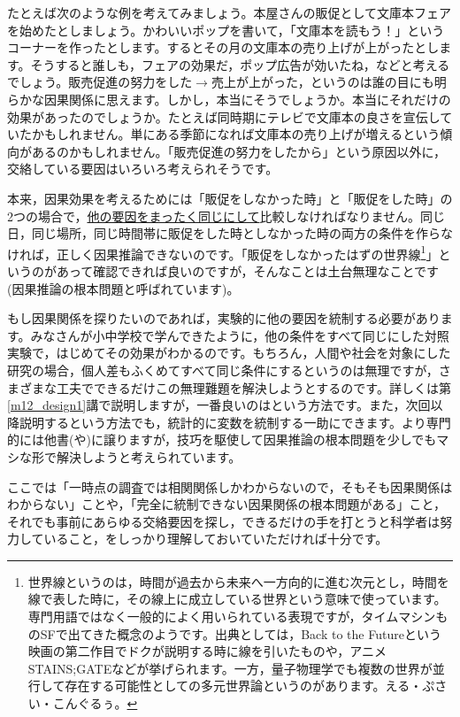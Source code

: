 \documentclass{ltjbook}
\begin{document}
たとえば次のような例を考えてみましょう。本屋さんの販促として文庫本フェアを始めたとしましょう。かわいいポップを書いて，「文庫本を読もう！」というコーナーを作ったとします。するとその月の文庫本の売り上げが上がったとします。そうすると誰しも，フェアの効果だ，ポップ広告が効いたね，などと考えるでしょう。販売促進の努力をした$\to$売上が上がった，というのは誰の目にも明らかな因果関係に思えます。しかし，本当にそうでしょうか。本当にそれだけの効果があったのでしょうか。たとえば同時期にテレビで文庫本の良さを宣伝していたかもしれません。単にある季節になれば文庫本の売り上げが増えるという傾向があるのかもしれません。「販売促進の努力をしたから」という原因以外に，交絡している要因はいろいろ考えられそうです。

本来，因果効果を考えるためには「販促をしなかった時」と「販促をした時」の2つの場合で，\underline{他の要因をまったく同じにして}比較しなければなりません。同じ日，同じ場所，同じ時間帯に販促をした時としなかった時の両方の条件を作らなければ，正しく因果推論できないのです。「販促をしなかったはずの世界線\footnote{世界線というのは，時間が過去から未来へ一方向的に進む次元とし，時間を線で表した時に，その線上に成立している世界という意味で使っています。専門用語ではなく一般的によく用いられている表現ですが，タイムマシンものSFで出てきた概念のようです。出典としては，Back to the Futureという映画の第二作目でドクが説明する時に線を引いたものや，アニメSTAINS;GATEなどが挙げられます。一方，量子物理学でも複数の世界が並行して存在する可能性としての多元世界論というのがあります。える・ぷさい・こんぐるぅ。}」というのがあって確認できれば良いのですが，そんなことは土台無理なことです(因果推論の根本問題\parencite{Yasui2019}と呼ばれています)。

もし因果関係を探りたいのであれば，実験的に他の要因を統制する必要があります。みなさんが小中学校で学んできたように，他の条件をすべて同じにした対照実験で，はじめてその効果がわかるのです。もちろん，人間や社会を対象にした研究の場合，個人差もふくめてすべて同じ条件にするというのは無理ですが，さまざまな工夫でできるだけこの無理難題を解決しようとするのです。詳しくは第\ref{m12_design1}講で説明しますが，一番良いのはという方法です。また，次回以降説明するという方法でも，統計的に変数を統制する一助にできます。より専門的には他書(\textcite{Yasui2019}や\textcite{Takahashi20220210})に譲りますが，技巧を駆使して因果推論の根本問題を少しでもマシな形で解決しようと考えられています。

ここでは「一時点の調査では相関関係しかわからないので，そもそも因果関係はわからない」ことや，「完全に統制できない因果関係の根本問題がある」こと，それでも事前にあらゆる交絡要因を探し，できるだけの手を打とうと科学者は努力していること，をしっかり理解しておいていただければ十分です。
\end{document}
